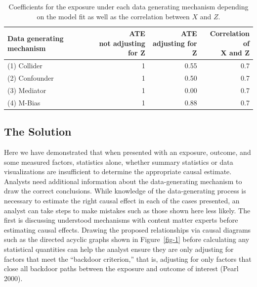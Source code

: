 \documentclass[
  letterpaper,
  DIV=11,
  numbers=noendperiod]{scrartcl}
\begin{document}
\hypertarget{tbl-2}{}
\begin{table}
\caption{\label{tbl-2}Coefficients for the exposure under each data generating mechanism
depending on the model fit as well as the correlation between \(X\) and
\(Z\). }\tabularnewline

\centering
\begin{tabular}{lrrr}
\toprule
Data generating mechanism & \makecell[c]{ATE\\not adjusting for Z} & \makecell[c]{ATE\\adjusting for Z} & \makecell[c]{Correlation of\\X and Z}\\
\midrule
(1) Collider & 1 & 0.55 & 0.7\\
(2) Confounder & 1 & 0.50 & 0.7\\
(3) Mediator & 1 & 0.00 & 0.7\\
(4) M-Bias & 1 & 0.88 & 0.7\\
\bottomrule
\end{tabular}
\end{table}

\hypertarget{the-solution}{%
\subsection{The Solution}\label{the-solution}}

Here we have demonstrated that when presented with an exposure, outcome,
and some measured factors, statistics alone, whether summary statistics
or data visualizations are insufficient to determine the appropriate
causal estimate. Analysts need additional information about the
data-generating mechanism to draw the correct conclusions. While
knowledge of the data-generating process is necessary to estimate the
right causal effect in each of the cases presented, an analyst can take
steps to make mistakes such as those shown here less likely. The first
is discussing understood mechanisms with content matter experts before
estimating causal effects. Drawing the proposed relationships via causal
diagrams such as the directed acyclic graphs shown in Figure~\ref{fig-1}
before calculating any statistical quantities can help the analyst
ensure they are only adjusting for factors that meet the ``backdoor
criterion,'' that is, adjusting for only factors that close all backdoor
paths between the exposure and outcome of interest (Pearl 2000).
\end{document}
